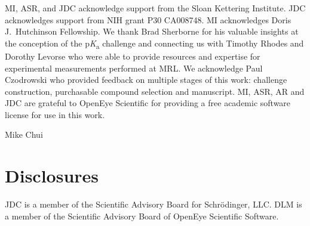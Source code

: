 \documentclass[9pt,lineno]{elife}
\newcommand{\pKa}{p\textit{K}\textsubscript{a}}
\begin{document}
MI, ASR, and JDC acknowledge support from the Sloan Kettering Institute.
JDC acknowledges support from NIH grant P30 CA008748. 
MI acknowledges Doris J.\ Hutchinson Fellowship. 
We thank Brad Sherborne for his valuable insights at the conception of the \pKa{} challenge and connecting us with Timothy Rhodes and Dorothy Levorse who were able to provide resources and expertise for experimental measurements performed at MRL. 
We acknowledge Paul Czodrowski who provided feedback on multiple stages of this work: challenge construction, purchasable compound selection and manuscript. 
MI, ASR, AR and JDC are grateful to OpenEye Scientific for providing a free academic software license for use in this work.

Mike Chui

\section{Disclosures}

JDC is a member of the Scientific Advisory Board for Schr\"{o}dinger, LLC.
DLM is a member of the Scientific Advisory Board of OpenEye Scientific Software.



\end{document}
